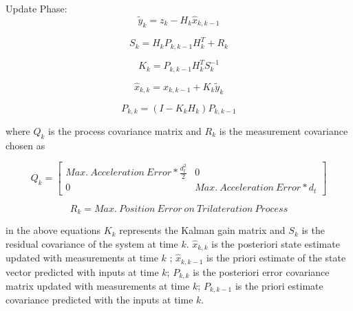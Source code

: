 Update Phase:
\begin{equation}
\tilde{y}_k = z_k - H_k  \hat{x}_{k,k-1} 
\end{equation}

\begin{equation}
S_k = H_k P_{k,k-1} H^T_k + R_k
\end{equation}

\begin{equation}
K_k =  P_{k,k-1} H^T_kS_k^{-1}
\end{equation}
		
\begin{equation}
 \hat{x}_{k,k} =  \hat{x}_{k,k-1} + K_k \tilde{y}_k
\end{equation}
		
\begin{equation}
P_{k,k} = (I - K_kH_k)P_{k,k-1}
\end{equation}
		
where $Q_k$ is the process covariance matrix and $R_k$ is the measurement covariance chosen as 

\begin{equation}
Q_k = \begin{bmatrix}
Max.\ Acceleration\ Error * \frac{d^2_t}{2} & 0 \\
0 & Max.\ Acceleration\ Error * d_t
\end{bmatrix}
\end{equation}
		
\begin{equation}
R_k = Max.\ Position\ Error\ on\ Trilateration\ Process
\end{equation}
		
in the above equations $K_k$ represents the Kalman gain matrix and $S_k$ is the residual covariance of the system at time $k$. $\hat{x}_{k,k}$ is the posteriori state estimate updated with measurements at time $k$ ;  $\hat{x}_{k,k-1}$ is the priori estimate of the state vector predicted with inputs at time $k$; $P_{k,k}$ is the posteriori error covariance matrix updated with measurements at time $k$; $P_{k,k-1}$ is the priori estimate covariance predicted with the inputs at time $k$.
			
